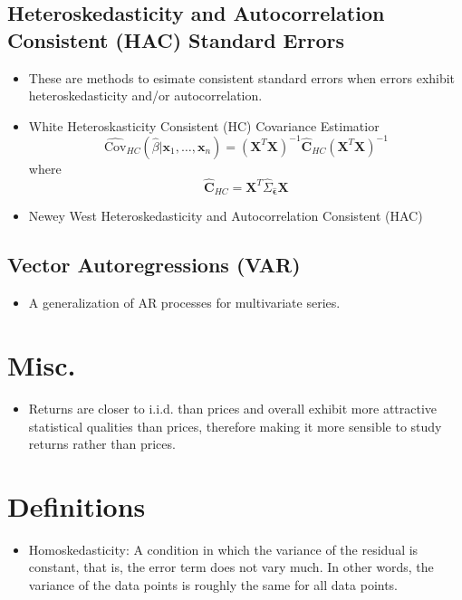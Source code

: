 \documentclass[11pt]{article}
\begin{document}
\subsection{Heteroskedasticity and Autocorrelation Consistent (HAC) Standard Errors}
\begin{itemize}
    \item These are methods to esimate consistent standard errors when errors exhibit 
    heteroskedasticity and/or autocorrelation.
    \item White Heteroskasticity Consistent (HC) Covariance Estimatior
    \[
    \hat{\text{Cov}}_{HC} (\hat{\beta} | \boldsymbol{x}_1, \ldots, \boldsymbol{x}_n) = 
    {(\boldsymbol{X}^T \boldsymbol{X})}^{-1} \hat{\boldsymbol{C}}_{HC} {(\boldsymbol{X}^T 
    \boldsymbol{X})}^{-1}
    \]
    where 
    \[
    \hat{\boldsymbol{C}}_{HC} = \boldsymbol{X}^T \hat{\Sigma}_{\hat{\boldsymbol{\epsilon}}}
    \boldsymbol{X}
    \]
    \item Newey West Heteroskedasticity and Autocorrelation Consistent (HAC)
\end{itemize}

\subsection{Vector Autoregressions (VAR)}
\begin{itemize}
    \item A generalization of AR processes for multivariate series. 
\end{itemize}



\section{Misc.}
\begin{itemize}
    \item Returns are closer to i.i.d. than prices and overall exhibit more attractive 
    statistical qualities than prices, therefore making it more sensible to study returns 
    rather than prices. 
\end{itemize}

\section{Definitions}
\begin{itemize}
    \item Homoskedasticity: A condition in which the variance of the residual is constant, that
    is, the error term does not vary much. In other words, the variance of the data points is 
    roughly the same for all data points. 
\end{itemize}
\end{document}

